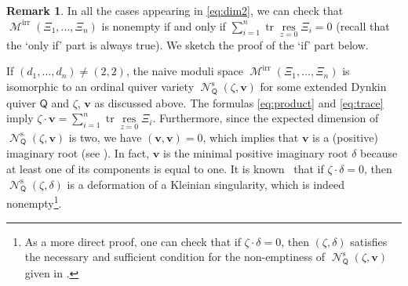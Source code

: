 \documentclass[pdftex]{sigma}
\numberwithin{equation}{section}
\theoremstyle{definition}
\newtheorem{Remark}[Theorem]{Remark}
\newcommand{\tr}{\operatorname{tr}}
\newcommand{\bv}{\mathbf{v}}
\newcommand{\res}{\operatorname*{res}}
\newcommand{\Mirr}{\operatorname{\mathcal{M}}^\mathrm{irr}}
\newcommand{\Qst}{\operatorname{\mathscr{N}}^\mathrm{s}}
\newcommand{\QQ}{\mathsf{Q}} %
\begin{document}
\begin{Remark}\label{rem:nonempty}
In all the cases appearing in \eqref{eq:dim2},
we can check that $\Mirr(\Xi_1,\dots ,\Xi_n)$ is nonempty
if and only if
$\sum\limits_{i=1}^n \tr \res\limits_{z=0} \Xi_i =0$
(recall that the `only if' part is always true).
We sketch the proof of the `if' part below.

If $(d_1,\dots ,d_n) \neq (2,2)$,
the naive moduli space $\Mirr(\Xi_1,\dots ,\Xi_n)$
is isomorphic to an ordinal quiver variety
$\Qst_\QQ(\zeta,\bv)$ for some extended Dynkin quiver $\QQ$
and $\zeta$, $\bv$ as discussed above.
The formulas \eqref{eq:product} and \eqref{eq:trace} imply
$\zeta \cdot \bv = \sum\limits_{i=1}^n \tr \res\limits_{z=0} \Xi_i$.
Furthermore, since the expected dimension of $\Qst_\QQ(\zeta,\bv)$
is two, we have $(\bv,\bv)=0$,
which implies that $\bv$ is a (positive) imaginary root
(see \cite[Proposition~5.10]{MR1104219}).
In fact, $\bv$ is the minimal positive imaginary root $\delta$
because at least one of its components is equal to one.
It is known~\cite{MR992334} that if $\zeta \cdot \delta =0$,
then $\Qst_\QQ(\zeta,\delta)$
is a deformation of a Kleinian singularity,
which is indeed nonempty\footnote{As a more direct proof,
one can check that if $\zeta \cdot \delta =0$, then
$(\zeta,\delta)$ satisf\/ies the necessary and suf\/f\/icient condition
for the non-emptiness of $\Qst_\QQ(\zeta,\bv)$ given in
\cite[Theorem~1.2]{MR1834739}.}.


\end{Remark}
\end{document}
